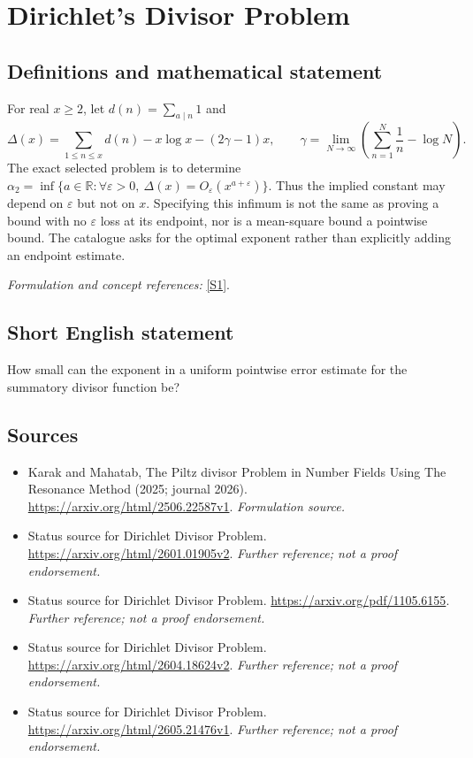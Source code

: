 \documentclass[11pt]{article}
\begin{document}
\section*{\texorpdfstring{Dirichlet's Divisor Problem}{Dirichlet's Divisor Problem}}\label{1278}
\subsection{Definitions and mathematical statement}
For real $x\ge2$, let $d(n)=\sum_{a\mid n}1$ and
\[
 \Delta(x)=\sum_{1\le n\le x}d(n)-x\log x-(2\gamma-1)x,
 \qquad \gamma=\lim_{N\to\infty}\left(\sum_{n=1}^N\frac1n-\log N\right).
\]
The exact selected problem is to determine
$\alpha_2=\inf\{a\in{\mathbb{R}}:\forall{\varepsilon}>0,\ \Delta(x)=O_{\varepsilon}(x^{a+{\varepsilon}})\}$.
Thus the implied constant may depend on ${\varepsilon}$ but not on $x$. Specifying this infimum is not the same as proving a bound with no ${\varepsilon}$ loss at its endpoint, nor is a mean-square bound a pointwise bound. The catalogue asks for the optimal exponent rather than explicitly adding an endpoint estimate.
\par\smallskip\textit{Formulation and concept references:} \href{https://arxiv.org/html/2506.22587v1}{[S1]}.

\subsection{Short English statement}
How small can the exponent in a uniform pointwise error estimate for the summatory divisor function be?
\subsection{Sources}
\begin{itemize}
\item[S1]Karak and Mahatab, The Piltz divisor Problem in Number Fields Using The Resonance Method (2025; journal 2026).
\url{https://arxiv.org/html/2506.22587v1}.
\textit{Formulation source.}
\item[S2]Status source for Dirichlet Divisor Problem.
\url{https://arxiv.org/html/2601.01905v2}.
\textit{Further reference; not a proof endorsement.}
\item[S3]Status source for Dirichlet Divisor Problem.
\url{https://arxiv.org/pdf/1105.6155}.
\textit{Further reference; not a proof endorsement.}
\item[S4]Status source for Dirichlet Divisor Problem.
\url{https://arxiv.org/html/2604.18624v2}.
\textit{Further reference; not a proof endorsement.}
\item[S5]Status source for Dirichlet Divisor Problem.
\url{https://arxiv.org/html/2605.21476v1}.
\textit{Further reference; not a proof endorsement.}
\end{itemize}
\end{document}
